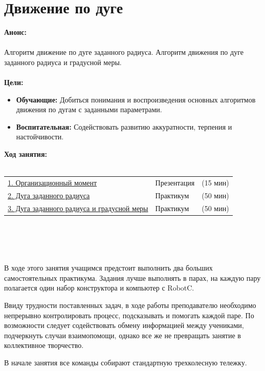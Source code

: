 \chapter{\label{lesson12}Движение по дуге}
{\bfseries Анонс:}\\\\
Алгоритм движение по дуге заданного радиуса. Алгоритм движения по дуге заданного радиуса и градусной меры.\\\\
{\bfseries Цели:}
\begin{itemize}
	\item{}{\bfseries Обучающие:} Добиться понимания и воспроизведения основных алгоритмов движения по дугам с заданными параметрами.
	\item{}{\bfseries Воспитательная:} Содействовать развитию аккуратности, терпения и настойчивости.\\
\end{itemize}	
{\bfseries Ход занятия:}\\\\
\begin{tabular}{lll}
	\hyperlink{lesson12x1}{1. Организационный момент} & Презентация & (15 мин)\\
	\hyperlink{lesson12x2}{2. Дуга заданного радиуса} & Практикум & (50 мин) \\
	\hyperlink{lesson12x3}{3. Дуга заданного радиуса и градусной меры} & Практикум & (50 мин) \\
\end{tabular}\\\\

{\hypertarget{lesson12x1}{}}\\\\ 

В ходе этого занятия учащимся предстоит выполнить два больших самостоятельных практикума. Задания лучше выполнять в парах, на каждую пару полагается один набор конструктора и компьютер с RobotC.

Ввиду трудности поставленных задач, в ходе работы преподавателю необходимо непрерывно контролировать процесс, подсказывать и помогать каждой паре. По возможности следует содействовать обмену информацией  между учениками, подчеркнуть случаи взаимопомощи, однако все же не превращать занятие в коллективное творчество.

В начале занятия все команды собирают стандартную трехколесную тележку.\\\\

